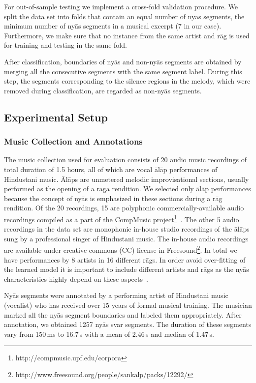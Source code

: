 {For out-of-sample testing we implement a cross-fold validation procedure. We split the data set into folds that contain an equal number of ny\={a}s segments, the minimum number of ny\={a}s segments in a musical excerpt (7 in our case). Furthermore, we make sure that no instance from the same artist and r\={a}g is used for training and testing in the same fold.

After classification, boundaries of ny\={a}s and non-ny\={a}s segments are obtained by merging all the consecutive segments with the same segment label. During this step, the segments corresponding to the silence regions in the melody, which were removed during classification, are regarded as non-ny\={a}s segments.

\subsection{Experimental Setup}
\label{experimentalSetup}

\subsubsection{Music Collection and Annotations}

The music collection used for evaluation consists of 20 audio music recordings  of total duration of 1.5 hours, all of which are vocal \={a}l\={a}p performances of Hindustani music. \={A}l\={a}ps are unmetered melodic improvisational sections, usually performed as the opening of a raga rendition. We selected only \={a}l\={a}p performances because the concept of ny\={a}s is emphasized in these sections during a r\={a}g rendition. Of the 20 recordings, 15 are polyphonic commercially-available audio recordings compiled as a part of the CompMusic project\footnote{http://compmusic.upf.edu/corpora}~\cite{XavierSerra2011}. The other 5 audio recordings in the data set are monophonic in-house studio recordings of the \={a}l\={a}ps sung by a professional singer of Hindustani music. The in-house audio recordings are available under creative commons (CC) license in Freesound\footnote{http://www.freesound.org/people/sankalp/packs/12292/}. In total we have performances by 8 artists in 16 different r\={a}gs. In order avoid over-fitting of the learned model it is important to include different artists and r\={a}gs as the ny\={a}s characteristics highly depend on these aspects~\cite{Dey2008}.

Ny\={a}s segments were annotated by a performing artist of Hindustani music (vocalist) who has received over 15 years of formal musical training. 
The musician marked all the ny\={a}s segment boundaries and labeled them appropriately. After annotation, we obtained 1257 ny\={a}s svar segments. The duration of these segments vary from 150\,ms to 16.7\,s with a mean of 2.46\,s and median of 1.47\,s.

}
